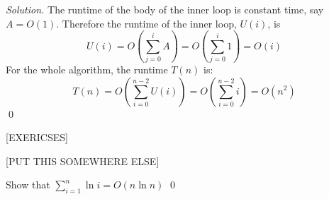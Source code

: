 \textit{Solution.}
The runtime of the body of the inner loop is constant time, 
say $A = O(1)$.
Therefore the runtime of the inner loop, $U(i)$, is
\[
U(i) = O \left( \sum_{j=0}^i A \right) = O \left( \sum_{j=0}^i 1 \right) = O(i)
\]
For the whole algorithm, the runtime $T(n)$ is:
\[
T(n) 
= O \left( \sum_{i=0}^{n-2} U(i) \right) 
= O \left( \sum_{i=0}^{n-2} i \right) 
= O \left( n^2 \right)
\]
\qed

\newpage

[EXERICSES]

[PUT THIS SOMEWHERE ELSE]
\begin{ex} Show that
$\sum_{i = 1}^n \ln i = O(n \ln n)$
\qed
\end{ex}

